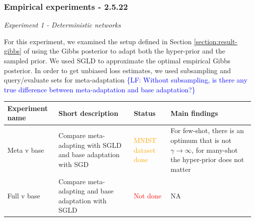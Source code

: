 \documentclass[letterpaper]{article}
\theoremstyle{definition}
\newcommand{\LF}[1]{\textcolor{blue}{\{LF: #1\}}}
\begin{document}
%
%
%

\subsubsection{Empirical experiments - 2.5.22}

\emph{Experiment 1 - Deterministic networks}

For this experiment, we examined the setup defined in Section \ref{section:result-gibbs} of using the Gibbs posterior to adapt both the hyper-prior and the sampled prior.
We used SGLD \citep{Welling2011} to approximate the optimal empirical Gibbs posterior.
In order to get unbiased loss estimates, we used subsampling and query/evaluate sets for meta-adaptation \LF{Without subsampling, is there any true difference between meta-adaptation and base adaptation?}

\begin{tabularx}{\textwidth}{|X|X | X | X|}
    \hline
     Experiment name & Short description & Status & Main findings \\
     \hline \hline
     Meta v base & Compare meta-adapting with SGLD and base adaptation with SGD & \textcolor{orange}{MNIST dataset done} & For few-shot, there is an optimum that is not $\gamma \rightarrow \infty$, for many-shot the hyper-prior does not matter  \\
     \hline
     Full v base & Compare meta-adapting and base adaptation with SGLD & \textcolor{red}{Not done} & NA \\
     \hline
\end{tabularx}
\end{document}
